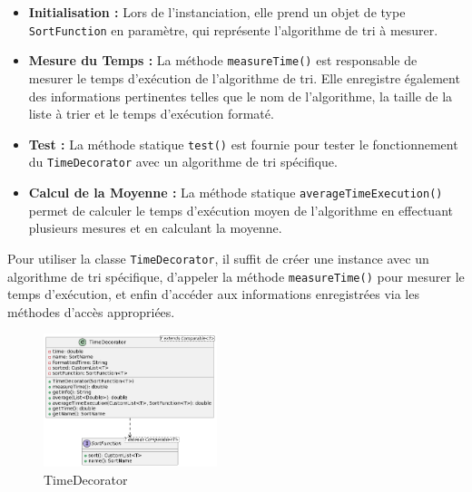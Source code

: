 \documentclass[a4paper,12pt]{article}
\begin{document}
\begin{itemize}
    \item \textbf{Initialisation :} Lors de l'instanciation, elle prend un objet de type \texttt{SortFunction} en paramètre, qui représente l'algorithme de tri à mesurer.
    \item \textbf{Mesure du Temps :} La méthode \texttt{measureTime()} est responsable de mesurer le temps d'exécution de l'algorithme de tri. Elle enregistre également des informations pertinentes telles que le nom de l'algorithme, la taille de la liste à trier et le temps d'exécution formaté.
    \item \textbf{Test :} La méthode statique \texttt{test()} est fournie pour tester le fonctionnement du \texttt{TimeDecorator} avec un algorithme de tri spécifique.
    \item \textbf{Calcul de la Moyenne :} La méthode statique \texttt{averageTimeExecution()} permet de calculer le temps d'exécution moyen de l'algorithme en effectuant plusieurs mesures et en calculant la moyenne.\\
\end{itemize}
Pour utiliser la classe \texttt{TimeDecorator}, il suffit de créer une instance avec un algorithme de tri spécifique, d'appeler la méthode \texttt{measureTime()} pour mesurer le temps d'exécution, et enfin d'accéder aux informations enregistrées via les méthodes d'accès appropriées.
\begin{figure}[h]
    \centering
    \includegraphics[width=0.45\textwidth]{TimeDecorator.png}
    \caption{TimeDecorator}
    \label{fig:mon_image}
\end{figure}
\end{document}
